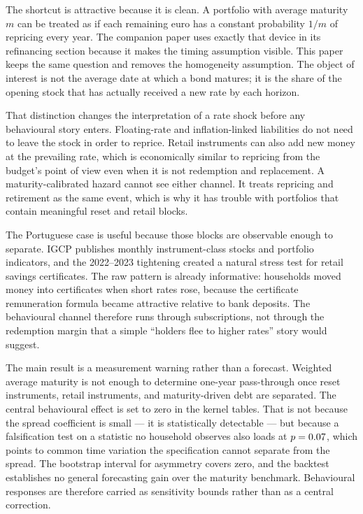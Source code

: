 \documentclass[11pt,a4paper]{article}
\begin{document}
The shortcut is attractive because it is clean. A portfolio with average
maturity $m$ can be treated as if each remaining euro has a constant probability
$1/m$ of repricing every year. The companion paper uses exactly that device in
its refinancing section because it makes the timing assumption visible. This
paper keeps the same question and removes the homogeneity assumption. The
object of interest is not the average date at which a bond matures; it is the
share of the opening stock that has actually received a new rate by each
horizon.

That distinction changes the interpretation of a rate shock before any
behavioural story enters. Floating-rate and inflation-linked liabilities do not
need to leave the stock in order to reprice. Retail instruments can also add
new money at the prevailing rate, which is economically similar to repricing
from the budget's point of view even when it is not redemption and replacement.
A maturity-calibrated hazard cannot see either channel. It treats repricing and
retirement as the same event, which is why it has trouble with portfolios that
contain meaningful reset and retail blocks.

The Portuguese case is useful because those blocks are observable enough to
separate. IGCP publishes monthly instrument-class stocks and portfolio
indicators, and the 2022--2023 tightening created a natural stress test for
retail savings certificates. The raw pattern is already informative:
households moved money into certificates when short rates rose, because the
certificate remuneration formula became attractive relative to bank deposits.
The behavioural channel therefore runs through subscriptions, not through the
redemption margin that a simple ``holders flee to higher rates'' story would
suggest.

The main result is a measurement warning rather than a forecast. Weighted
average maturity is not enough to determine one-year pass-through once reset
instruments, retail instruments, and maturity-driven debt are separated. The
central behavioural effect is set to zero in the kernel tables. That is not
because the spread coefficient is small --- it is statistically detectable ---
but because a falsification test on a statistic no household observes also
loads at $p = 0.07$, which points to common time variation the
specification cannot separate from the spread. The bootstrap interval for
asymmetry covers zero, and the backtest establishes no general forecasting gain
over the maturity benchmark. Behavioural responses are therefore carried as
sensitivity bounds rather than as a central correction.
\end{document}
